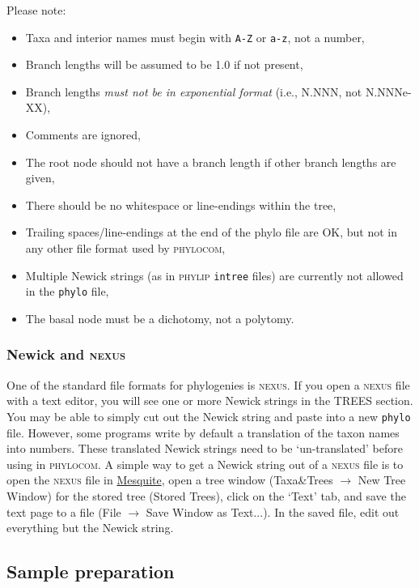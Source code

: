 \documentclass[12pt,letterpaper]{article}
\begin{document}
Please note: 

\begin{itemize}
  \item Taxa and interior names must begin with \verb|A-Z| or
    \verb|a-z|, not a number,
  \item Branch lengths will be assumed to be 1.0 if not present,
  \item Branch lengths {\em must not be in exponential format} (i.e.,
    N.NNN, not N.NNNe-XX),
  \item Comments are ignored,
  \item The root node should not have a branch length if other branch
    lengths are given,
  \item There should be no whitespace or line-endings within the tree,
  \item Trailing spaces/line-endings at the end of the phylo file are
    OK, but not in any other file format used by {\scshape phylocom},
  \item Multiple Newick strings (as in {\scshape phylip} \verb|intree|
    files) are currently not allowed in the \verb|phylo| file,
  \item The basal node must be a dichotomy, not a polytomy.
\end{itemize}

\subsubsection{Newick and {\scshape nexus}}

One of the standard file formats for phylogenies is {\scshape nexus}.  If
you open a {\scshape nexus} file with a text editor, you will see one or
more Newick strings in the TREES section.  You may be able to simply
cut out the Newick string and paste into a new \verb|phylo| file.
However, some programs write by default a translation of the taxon
names into numbers.  These translated Newick strings need to be
`un-translated' before using in {\scshape phylocom}.  A simple way to get a
Newick string out of a {\scshape nexus} file is to open the {\scshape nexus}
file in \href{http://mesquiteproject.org/}{Mesquite},
open a tree window (Taxa\&Trees $\to$ New Tree Window) for the stored
tree (Stored Trees), click on the `Text' tab, and save the text page
to a file (File $\to$ Save Window as Text...).  In the saved file,
edit out everything but the Newick string.

\subsection{Sample preparation}
 
\end{document}
